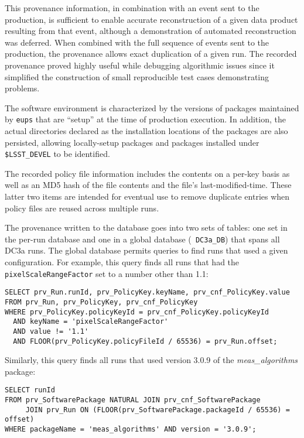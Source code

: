 This provenance information, in combination with an event sent to the
production, is sufficient to enable accurate reconstruction of a given
data product resulting from that event, although a demonstration of
automated reconstruction was deferred.  When combined with the full
sequence of events sent to the production, the provenance allows exact
duplication of a given run.  The recorded provenance proved highly
useful while debugging algorithmic issues since it simplified the
construction of small reproducible test cases demonstrating problems.

The software environment is characterized by the versions of packages
maintained by {\tt eups} that are ``setup'' at the time of production
execution.  In addition, the actual directories declared as the
installation locations of the packages are also persisted, allowing
locally-setup packages and packages installed under {\tt \$LSST\_DEVEL} to
be identified.

The recorded policy file information includes the contents on a per-key
basis as well as an MD5 hash of the file contents and the file's
last-modified-time.  These latter two items are intended for eventual
use to remove duplicate entries when policy files are reused across
multiple runs.

The provenance written to the database goes into two sets of tables: one
set in the per-run database and one in a global database ({\tt
DC3a\_DB}) that spans all DC3a runs.  The global database permits
queries to find runs that used a given configuration.  For example, this
query finds all runs that had the {\tt pixelScaleRangeFactor} set to a
number other than 1.1:

\begin{verbatim}
SELECT prv_Run.runId, prv_PolicyKey.keyName, prv_cnf_PolicyKey.value
FROM prv_Run, prv_PolicyKey, prv_cnf_PolicyKey
WHERE prv_PolicyKey.policyKeyId = prv_cnf_PolicyKey.policyKeyId
  AND keyName = 'pixelScaleRangeFactor'
  AND value != '1.1'
  AND FLOOR(prv_PolicyKey.policyFileId / 65536) = prv_Run.offset;
\end{verbatim}

Similarly, this query finds all runs that used version 3.0.9 of the {\it
meas\_algorithms} package:

\begin{verbatim}
SELECT runId
FROM prv_SoftwarePackage NATURAL JOIN prv_cnf_SoftwarePackage
     JOIN prv_Run ON (FLOOR(prv_SoftwarePackage.packageId / 65536) = offset)
WHERE packageName = 'meas_algorithms' AND version = '3.0.9';
\end{verbatim}

